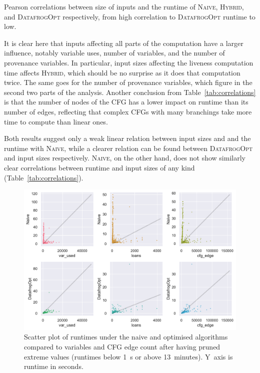 \documentclass[11pt,a4paper,twoside,openany,draft]{report}
\begin{document}
\begin{table}[ht]
  
  \caption[Pearson Correlations Between Sizes of Inputs and Runtime]{Pearson
    correlations between size of inputs and the runtime of \textsc{Naive},
    \textsc{Hybrid}, and \textsc{DatafrogOpt} respectively, from high
    correlation to \textsc{DatafrogOpt} runtime to low.}\label{tab:correlations}
\end{table}%

It is clear here that inputs affecting all parts of the computation have a
larger influence, notably variable uses, number of variables, and the number of
provenance variables. In particular, input sizes affecting the liveness
computation time affects \textsc{Hybrid}, which should be no surprise as it does
that computation twice. The same goes for the number of provenance variables,
which figure in the second two parts of the analysis. Another conclusion from
Table~\ref{tab:correlations} is that the number of nodes of the CFG has a lower
impact on runtime than its number of edges, reflecting that complex CFGs with
many branchings take more time to compute than linear ones.

Both results suggest only a weak linear relation between input sizes and
and the runtime with \textsc{Naive}, while a clearer relation can be
found between \textsc{DatafrogOpt} and input sizes respectively. \textsc{Naive},
on the other hand, does not show similarly clear correlations between runtime
and input sizes of any kind (Table~\ref{tab:correlations}).

\begin{figure}
  \includegraphics[width=0.9\linewidth]{Graphs/corr_scatter.pdf}
  \caption[Scatter Plot of Runtimes On Two Polonius Variants vs.\ nr.\ of CFG
  Edges and Variables]{Scatter plot of runtimes under the naive and optimised
    algorithms compared to variables and CFG edge count after having pruned
    extreme values (runtimes below 1~s or above 13~minutes). Y~axis is runtime
    in seconds.}\label{fig:input-scatter}
\end{figure}
\end{document}
